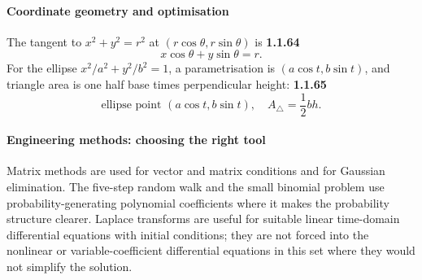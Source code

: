 \paragraph*{Coordinate geometry and optimisation}
The tangent to $x^2+y^2=r^2$ at $(r\cos\theta,r\sin\theta)$ is
\noindent\textbf{1.1.64}\quad
\[
x\cos\theta+y\sin\theta=r.\tag{1.1.64.1}\label{eq:circle-tangent-64}
\]
For the ellipse $x^2/a^2+y^2/b^2=1$, a parametrisation is $(a\cos t,b\sin t)$, and triangle area is one half base times perpendicular height:
\noindent\textbf{1.1.65}\quad
\[\text{ellipse point }(a\cos t,b\sin t),\quad A_{\triangle}=\frac12 bh.\tag{1.1.65.1}\label{eq:ellipse-area-65}\]

\paragraph*{Engineering methods: choosing the right tool}
Matrix methods are used for vector and matrix conditions and for Gaussian elimination. The five-step random walk and the small binomial problem use probability-generating polynomial coefficients where it makes the probability structure clearer. Laplace transforms are useful for suitable linear time-domain differential equations with initial conditions; they are not forced into the nonlinear or variable-coefficient differential equations in this set where they would not simplify the solution.
